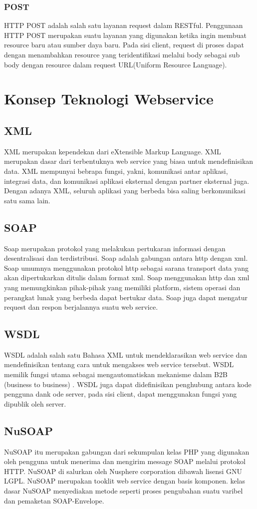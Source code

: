 \documentclass[12pt,a4paper]{article}
\begin{document}
\subsubsection{POST}
HTTP POST adalah salah satu layanan request dalam RESTful. Penggunaan HTTP POST merupakan suatu layanan yang digunakan ketika ingin membuat resource baru atau sumber daya baru. Pada sisi client, request di proses dapat dengan menambahkan resource yang teridentifikasi melalui body sebagai sub body dengan resource dalam request URL(Uniform Resource Language).

\section{Konsep Teknologi Webservice}
\subsection{XML}
XML merupakan kependekan dari eXtensible Markup Language. XML merupakan dasar dari terbentuknya web service yang biasa untuk mendefinisikan data. XML mempunyai bebrapa fungsi, yakni, komunikasi antar aplikasi, integrasi data, dan komunikasi aplikasi eksternal dengan partner eksternal juga. Dengan adanya XML, seluruh aplikasi yang berbeda bisa saling berkomunikasi satu sama lain.
\subsection{SOAP}
Soap merupakan protokol yang melakukan pertukaran informasi dengan desentralisasi dan terdistribusi. Soap adalah gabungan antara http dengan xml. Soap umumnya menggunakan protokol http sebagai sarana transport data yang akan dipertukarkan ditulis dalam format xml. Soap menggunakan http dan xml yang memungkinkan pihak-pihak yang memiliki platform, sistem operasi dan perangkat lunak yang berbeda dapat bertukar data. Soap juga dapat mengatur request dan respon berjalannya suatu web service.
\subsection{WSDL}
WSDL adalah salah satu Bahasa XML untuk mendeklarasikan web service dan mendefinisikan tentang cara untuk mengakses web service tersebut. WSDL memilik fungsi utama sebagai mengautomatiskan mekanisme dalam B2B (business to business) . WSDL juga dapat didefinisikan penghubung antara kode pengguna dank ode server, pada sisi client, dapat menggunakan fungsi yang dipublik oleh server.
\subsection{NuSOAP}
NuSOAP itu merupakan gabungan dari sekumpulan kelas  PHP yang digunakan oleh pengguna untuk menerima dan mengirim message SOAP melalui protokol HTTP. NuSOAP di  salurkan oleh Nusphere corporation dibawah lisensi GNU LGPL. NuSOAP merupakan tooklit web service dengan basis komponen. kelas dasar NuSOAP menyediakan metode seperti  proses pengubahan suatu varibel dan pemaketan SOAP-Envelope.
\end{document}
